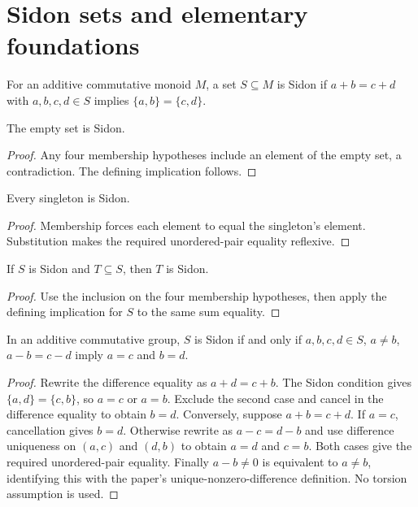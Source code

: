 \chapter{Sidon sets and elementary foundations}

\begin{definition}
\leanok\label{def:sidon_set}
For an additive commutative monoid $M$, a set $S\subseteq M$ is Sidon
if $a+b=c+d$ with $a,b,c,d\in S$ implies $\{a,b\}=\{c,d\}$.
\end{definition}

\begin{theorem}
\leanok{}
The empty set is Sidon.
\end{theorem}
\begin{proof}
Any four membership hypotheses include an element of the empty set,
a contradiction. The defining implication follows.
\end{proof}

\begin{theorem}[Singleton]
\leanok{}
Every singleton is Sidon.
\end{theorem}
\begin{proof}
Membership forces each element to equal the singleton's element.
Substitution makes the required unordered-pair equality reflexive.
\end{proof}

\begin{theorem}
\leanok{}
If $S$ is Sidon and $T\subseteq S$, then $T$ is Sidon.
\end{theorem}
\begin{proof}
Use the inclusion on the four membership hypotheses, then apply
the defining implication for $S$ to the same sum equality.
\end{proof}

\begin{lemma}
\leanok\label{found:diff}
In an additive commutative group, $S$ is Sidon if and only if
$a,b,c,d\in S$, $a\ne b$, $a-b=c-d$ imply $a=c$ and $b=d$.
\end{lemma}
\begin{proof}
Rewrite the difference equality as $a+d=c+b$. The Sidon condition
gives $\{a,d\}=\{c,b\}$, so $a=c$ or $a=b$. Exclude the second
case and cancel in the difference equality to obtain $b=d$.
Conversely, suppose $a+b=c+d$. If $a=c$, cancellation gives $b=d$.
Otherwise rewrite as $a-c=d-b$ and use difference uniqueness on
$(a,c)$ and $(d,b)$ to obtain $a=d$ and $c=b$.
Both cases give the required unordered-pair equality.
Finally $a-b\ne0$ is equivalent to $a\ne b$, identifying this with
the paper's unique-nonzero-difference definition. No torsion assumption
is used.
\end{proof}

